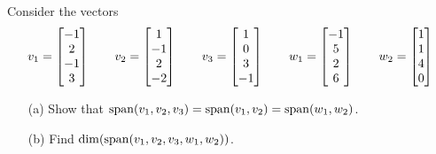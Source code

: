 \documentclass[a4paper]{amsart}
\begin{document}
\begin{exercise}\label{ex-dim-span}
 Consider the vectors
 \[ v_1 = \left[\begin{matrix} -1 \\  2 \\ -1 \\  3 \end{matrix}\right] \qquad
    v_2 = \left[\begin{matrix}  1 \\ -1 \\  2 \\ -2 \end{matrix}\right] \qquad
    v_3 = \left[\begin{matrix}  1 \\  0 \\  3 \\ -1 \end{matrix}\right] \qquad
    w_1 = \left[\begin{matrix} -1 \\  5 \\  2 \\  6 \end{matrix}\right] \qquad
    w_2 = \left[\begin{matrix}  1 \\  1 \\  4 \\  0 \end{matrix}\right]
 \]
 \begin{itemize}
  \item[(a)] Show that
   $\operatorname{span}(v_1,v_2,v_3)=\operatorname{span}(v_1,v_2)=\operatorname{span}(w_1,w_2)$.
  \item[(b)] Find $\dim(\operatorname{span}(v_1,v_2,v_3,w_1,w_2))$.
 \end{itemize}
\end{exercise}
\end{document}
